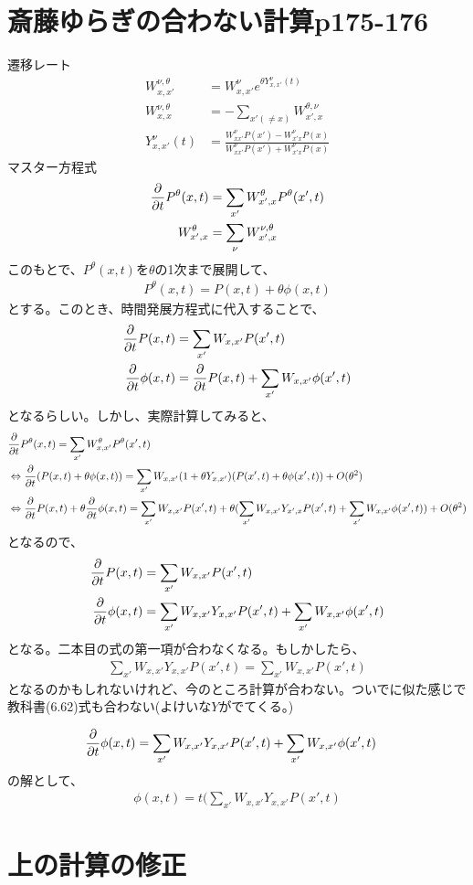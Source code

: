\documentclass[a4paper,11pt]{jsarticle}
\numberwithin{equation}{section}
\begin{document}
\section{斎藤ゆらぎの合わない計算p175-176}
遷移レート
\begin{align}
  W_{x,x'}^{\nu,\theta}&= W_{x,x'}^{\nu}e^{\theta Y_{x,x'}^{\nu}(t)}\\
  W_{x,x}^{\nu,\theta} &= -\sum_{x'(\neq x)}W_{x',x}^{\theta,\nu} \\
  Y_{x,x'}^{\nu}(t) &=  \frac{W^{\nu}_{xx'}P(x')-W^{\nu}_{x'x}P(x)}{W^{\nu}_{xx'}P(x')+W^{\nu}_{x'x}P(x)}
\end{align}
マスター方程式
\begin{align}
  \pdv{t}P^{\theta}(x,t) &= \sum_{x'}W_{x',x}^{\theta}P^{\theta}(x',t)\\
  W_{x',x}^{\theta} &= \sum_{\nu}W_{x',x}^{\nu,\theta}
\end{align}
このもとで、$P^{\theta}(x,t)$を$\theta$の1次まで展開して、
\begin{align}
  P^{\theta}(x,t) = P(x,t) + \theta\phi(x,t)
\end{align}
とする。このとき、時間発展方程式に代入することで、
\begin{align}
  \pdv{t}P(x,t) &= \sum_{x'}W_{x,x'}P(x',t)\\
  \pdv{t}\phi(x,t) &= \pdv{t}P(x,t) +\sum_{x'}W_{x,x'}\phi(x',t)
\end{align}
となるらしい。しかし、実際計算してみると、
\begin{align}
  &\pdv{t}P^{\theta}(x,t) = \sum_{x'}W_{x,x'}^{\theta}P^{\theta}(x',t)\\
  &\Leftrightarrow \pdv{t}(P(x,t) + \theta\phi(x,t)) = \sum_{x'}W_{x,x'}(1+\theta Y_{x,x'})(P(x',t) + \theta\phi(x',t)) +O(\theta^2)\\
  &\Leftrightarrow \pdv{t}P(x,t) + \theta\pdv{t}\phi(x,t) = \sum_{x'}W_{x,x'}P(x',t) + \theta(\sum_{x'}W_{x,x'}Y_{x',x}P(x',t) + \sum_{x'}W_{x,x'}\phi(x',t)) + O(\theta^2)
\end{align}
となるので、
\begin{align}
  \pdv{t}P(x,t) &= \sum_{x'}W_{x,x'}P(x',t)\\
  \pdv{t}\phi(x,t) &=\sum_{x'}W_{x,x'}Y_{x,x'}P(x',t) + \sum_{x'}W_{x,x'}\phi(x',t)
\end{align}
となる。二本目の式の第一項が合わなくなる。もしかしたら、
\begin{align}
  \sum_{x'}W_{x,x'}Y_{x,x'}P(x',t) = \sum_{x'}W_{x,x'}P(x',t)
\end{align}
となるのかもしれないけれど、今のところ計算が合わない。ついでに似た感じで教科書(6.62)式も合わない(よけいな$Y$がでてくる。)

\begin{align}
  \pdv{t}\phi(x,t) &=\sum_{x'}W_{x,x'}Y_{x,x'}P(x',t) + \sum_{x'}W_{x,x'}\phi(x',t)
\end{align}
の解として、
\begin{align}
  \phi(x,t) = t(\sum_{x'}W_{x,x'}Y_{x,x'}P(x',t) 
\end{align}

\section{上の計算の修正}
\end{document}

